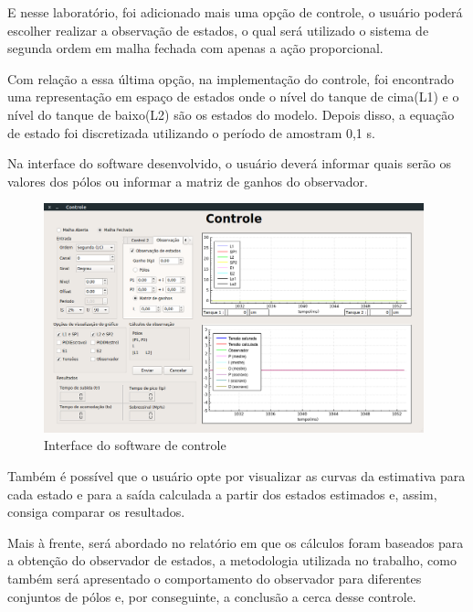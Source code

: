 \documentclass[a4paper,12pt]{article}
\begin{document}
\hspace{4ex}E nesse laboratório, foi adicionado mais uma opção de controle, o usuário poderá escolher realizar a observação de estados, o qual será utilizado o sistema de segunda ordem em malha fechada com apenas a ação proporcional. 

\hspace{4ex}Com relação a essa última opção, na implementação do controle, foi encontrado uma representação em espaço de estados onde o nível do tanque de cima(L1) e o nível do tanque de baixo(L2) são os estados do modelo. Depois disso, a equação de estado foi discretizada utilizando o período de amostram 0,1 s.

\hspace{4ex}Na interface do software desenvolvido, o usuário deverá informar quais serão os valores dos pólos ou informar a matriz de ganhos do observador.

\begin{figure}[H]
\centering
\includegraphics[width=11cm]{fotosLab5/interfaceObs.png}
\caption{Interface do software de controle}
\label{interface}
\end{figure}

\hspace{4ex}Também é possível que o usuário opte por visualizar as curvas da estimativa para cada estado e para a saída calculada a partir dos estados estimados e, assim, consiga comparar os resultados.

\hspace{4ex}Mais à frente, será abordado no relatório em que os cálculos foram baseados para a obtenção do observador de estados, a metodologia utilizada no trabalho, como também será apresentado o comportamento do observador para diferentes conjuntos de pólos e, por conseguinte, a conclusão a cerca desse controle.

\end{document}

